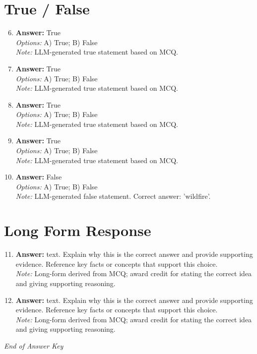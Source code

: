 \documentclass[12pt]{article}
\begin{document}
\section*{True / False}
\begin{enumerate}[label=\arabic*.]
\setcounter{enumi}{5}
\item \textbf{Answer:} True
\\ \textit{Options:} A) True; B) False
\\ \textit{Note:} LLM-generated true statement based on MCQ.
\item \textbf{Answer:} True
\\ \textit{Options:} A) True; B) False
\\ \textit{Note:} LLM-generated true statement based on MCQ.
\item \textbf{Answer:} True
\\ \textit{Options:} A) True; B) False
\\ \textit{Note:} LLM-generated true statement based on MCQ.
\item \textbf{Answer:} True
\\ \textit{Options:} A) True; B) False
\\ \textit{Note:} LLM-generated true statement based on MCQ.
\item \textbf{Answer:} False
\\ \textit{Options:} A) True; B) False
\\ \textit{Note:} LLM-generated false statement. Correct answer: 'wildfire'.
\end{enumerate}

\section*{Long Form Response}
\begin{enumerate}[label=\arabic*.]
\setcounter{enumi}{10}
\item \textbf{Answer:} text. Explain why this is the correct answer and provide supporting evidence. Reference key facts or concepts that support this choice.
\\ \textit{Note:} Long-form derived from MCQ; award credit for stating the correct idea and giving supporting reasoning.
\item \textbf{Answer:} text. Explain why this is the correct answer and provide supporting evidence. Reference key facts or concepts that support this choice.
\\ \textit{Note:} Long-form derived from MCQ; award credit for stating the correct idea and giving supporting reasoning.
\end{enumerate}

\vfill
\noindent\textit{End of Answer Key}
\end{document}
